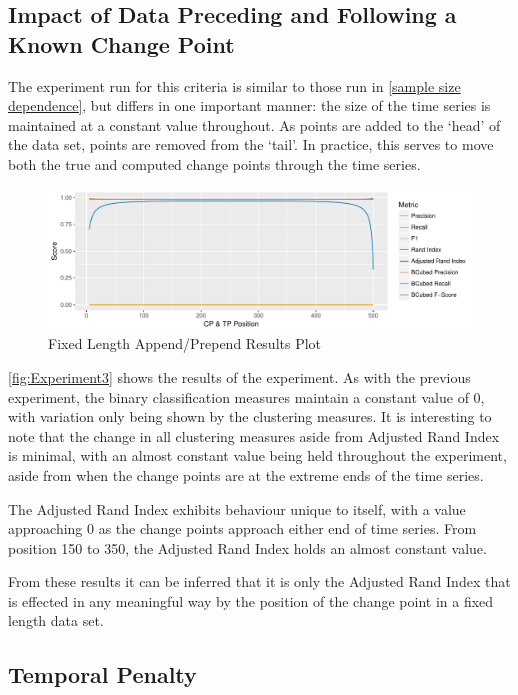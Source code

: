 \documentclass{uvamscse}	%
\begin{document}
\subsection{Impact of Data Preceding and Following a Known Change Point}

The experiment run for this criteria is similar to those run in \autoref{sample size dependence}, but differs in one important manner: the size of the time series is maintained at a constant value throughout. As points are added to the `head' of the data set, points are removed from the `tail'. In practice, this serves to move both the true and computed change points through the time series.

\begin{figure}[h]
    \includegraphics[width=\textwidth]{figures/Experiment2}
    \caption{Fixed Length Append/Prepend Results Plot}
    \label{fig:Experiment3}
\end{figure}

\autoref{fig:Experiment3} shows the results of the experiment. As with the previous experiment, the binary classification measures maintain a constant value of $0$, with variation only being shown by the clustering measures. It is interesting to note that the change in all clustering measures aside from Adjusted Rand Index is minimal, with an almost constant value being held throughout the experiment, aside from when the change points are at the extreme ends of the time series.

The Adjusted Rand Index exhibits behaviour unique to itself, with a value approaching 0 as the change points approach either end of time series. From position 150 to 350, the Adjusted Rand Index holds an almost constant value.

From these results it can be inferred that it is only the Adjusted Rand Index that is effected in any meaningful way by the position of the change point in a fixed length data set.

\subsection{Temporal Penalty}
\end{document}
